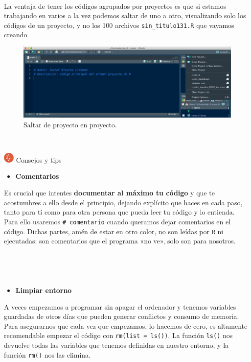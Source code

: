 \documentclass[11pt,]{book}
\providecommand{\tightlist}{%
  \setlength{\itemsep}{0pt}\setlength{\parskip}{0pt}}
\begin{document}
~

La ventaja de tener los códigos agrupados por proyectos es que si estamos trabajando en varios a la vez podemos saltar de uno a otro, visualizando solo los códigos de un proyecto, y no los 100 archivos \texttt{sin\_titulo131.R} que vayamos creando.

\begin{figure}

{\centering \includegraphics[width=0.5\linewidth]{./img/crear_proyecto9} 

}

\caption{Saltar de proyecto en proyecto.}\label{fig:crear-proyecto9}
\end{figure}

~

\includegraphics[width=0.04\textwidth,height=\textheight]{img/logo_info.png} Consejos y tips

\begin{itemize}
\tightlist
\item
  \textbf{Comentarios}
\end{itemize}

Es crucial que intentes \textbf{documentar al máximo tu código} y que te acostumbres a ello desde el principio, dejando explícito que haces en cada paso, tanto para ti como para otra persona que pueda leer tu código y lo entienda. Para ello usaremos \texttt{\#\ comentario} cuando queramos dejar comentarios en el código. Dichas partes, amén de estar en otro color, no son leídas por \texttt{R} ni ejecutadas: son comentarios que el programa «no ve», solo son para nosotros.

~

~

\begin{itemize}
\tightlist
\item
  \textbf{Limpiar entorno}
\end{itemize}

A veces empezamos a programar sin apagar el ordenador y tenemos variables guardadas de otros días que pueden generar conflictos y consumo de memoria. Para asegurarnos que cada vez que empezamos, lo hacemos de cero, es altamente recomendable empezar el código con \texttt{rm(list\ =\ ls())}. La función \texttt{ls()} nos devuelve todas las variables que tenemos definidas en nuestro entorno, y la función \texttt{rm()} nos las elimina.
\end{document}
